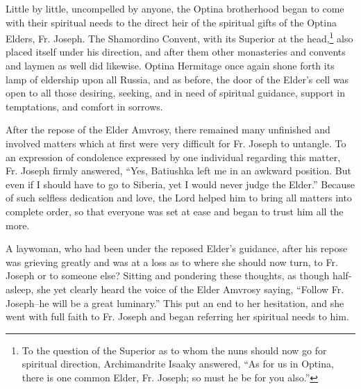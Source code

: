 Little by little, uncompelled by anyone, the Optina brotherhood began to come with their spiritual needs to the direct heir of the spiritual gifts of the Optina Elders, Fr. Joseph. The Shamordino Convent, with its Superior at the head,\footnote{To the question of the Superior as to whom the nuns should now go for spiritual direction, Archimandrite Isaaky answered, “As for us in Optina, there is one common Elder, Fr. Joseph; so must he be for you also.”} also placed itself under his direction, and after them other monasteries and convents and laymen as well did likewise. Optina Hermitage once again shone forth its lamp of eldership upon all Russia, and as before, the door of the Elder's cell was open to all those desiring, seeking, and in need of spiritual guidance, support in temptations, and comfort in sorrows.

After the repose of the Elder Amvrosy, there remained many unfinished and involved matters which at first were very difficult for Fr. Joseph to untangle. To an expression of condolence expressed by one individual regarding this matter, Fr. Joseph firmly answered, “Yes, Batiushka left me in an awkward position. But even if I should have to go to Siberia, yet I would never judge the Elder.” Because of such selfless dedication and love, the Lord helped him to bring all matters into complete order, so that everyone was set at ease and began to trust him all the more.

A laywoman, who had been under the reposed Elder's guidance, after his repose was grieving greatly and was at a loss as to where she should now turn, to Fr. Joseph or to someone else? Sitting and pondering these thoughts, as though half-asleep, she yet clearly heard the voice of the Elder Amvrosy saying, “Follow Fr. Joseph--he will be a great luminary.” This put an end to her hesitation, and she went with full faith to Fr. Joseph and began referring her spiritual needs to him.